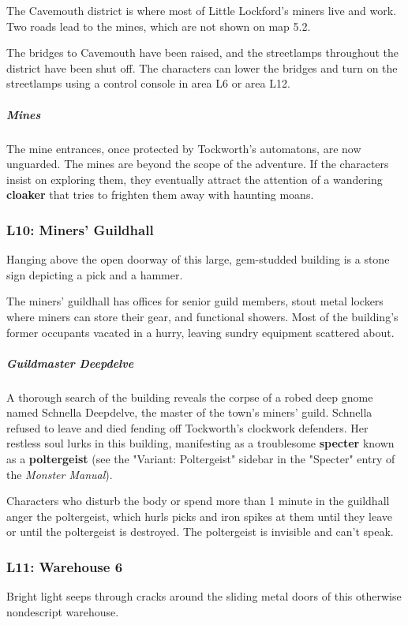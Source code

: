 \documentclass[10pt,a4paper,twoside,bg=print,twocolumn,openany,nodeprecatedcode]{dndbook}
\begin{document}
The Cavemouth district is where most of Little Lockford's miners live and work. Two roads lead to the mines, which are not shown on map 5.2.

The bridges to Cavemouth have been raised, and the streetlamps throughout the district have been shut off. The characters can lower the bridges and turn on the streetlamps using a control console in area L6 or area L12.

\subparagraph{Mines}
The mine entrances, once protected by Tockworth's automatons, are now unguarded. The mines are beyond the scope of the adventure. If the characters insist on exploring them, they eventually attract the attention of a wandering \textbf{cloaker} that tries to frighten them away with haunting moans.

\subsubsection{L10: Miners' Guildhall}
\begin{DndReadAloud}{}
Hanging above the open doorway of this large, gem-studded building is a stone sign depicting a pick and a hammer.

\end{DndReadAloud}

The miners' guildhall has offices for senior guild members, stout metal lockers where miners can store their gear, and functional showers. Most of the building's former occupants vacated in a hurry, leaving sundry equipment scattered about.

\subparagraph{Guildmaster Deepdelve}
A thorough search of the building reveals the corpse of a robed deep gnome named Schnella Deepdelve, the master of the town's miners' guild. Schnella refused to leave and died fending off Tockworth's clockwork defenders. Her restless soul lurks in this building, manifesting as a troublesome \textbf{specter} known as a \textbf{poltergeist} (see the "Variant: Poltergeist" sidebar in the "Specter" entry of the \textit{Monster Manual}).

Characters who disturb the body or spend more than 1 minute in the guildhall anger the poltergeist, which hurls picks and iron spikes at them until they leave or until the poltergeist is destroyed. The poltergeist is invisible and can't speak.

\subsubsection{L11: Warehouse 6}
\begin{DndReadAloud}{}
Bright light seeps through cracks around the sliding metal doors of this otherwise nondescript warehouse.

\end{DndReadAloud}
\end{document}
